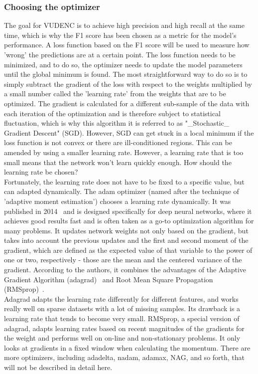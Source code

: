 \documentclass[
a4paper,
pagesize,
pdftex,
12pt,
ngerman,
fleqn,
final,
]{scrartcl}
\begin{document}
	\subsubsection{Choosing the optimizer}\label{optimizer}
	The goal for VUDENC is to achieve high precision and high recall at the same time, which is why the F1 score has been chosen as a metric for the model's performance. A loss function based on the F1 score will be used to measure how 'wrong' the predictions are at a certain point. The loss function needs to be minimized, and to do so, the optimizer needs to update the model parameters until the global minimum is found. 	The most straightforward way to do so is to simply subtract the gradient of the loss with respect to the weights multiplied by a small number called the 'learning rate' from the weights that are to be optimized. The gradient is calculated for a different sub-sample of the data with each iteration of the optimization and is therefore subject to statistical fluctuation, which is why this algorithm it is referred to as "\_Stochastic\_ Gradient Descent" (SGD). However, SGD can get stuck in a local minimum if the loss function is not convex or there are ill-conditioned regions. This can be amended by using a smaller learning rate. However, a learning rate that is too small means that the network won't learn quickly enough. How should the learning rate be chosen?\\
	Fortunately, the learning rate does not have to be fixed to a specific value, but can adapted dynamically. The adam optimizer (named after the technique of 'adaptive moment estimation') chooses a learning rate dynamically. It was published in 2014~\cite{Kingma.2014} and is designed specifically for deep neural networks, where it achieves good results fast and is often taken as a go-to optimization algorithm for many problems. It updates network weights not only based on the gradient, but takes into account the previous updates and the first and second moment of the gradient, which are defined as the expected value of that variable to the power of one or two, respectively - those are the mean and the centered variance of the gradient. According to the authors, it combines the advantages of the Adaptive Gradient Algorithm (adagrad)~\cite{Duchi.2011} and Root Mean Square Propagation (RMSprop)~\cite{Tieleman.2012}.\\
	Adagrad adapts the learning rate differently for different features, and works really well on sparse datasets with a lot of missing samples. Its drawback is a learning rate that tends to become very small. RMSprop, a special version of adagrad, adapts learning rates based on recent magnitudes of the gradients for the weight and performs well on on-line and non-stationary problems. It only looks at gradients in a fixed window when calculating the momentum. There are more optimizers, including adadelta, nadam, adamax, NAG, and so forth, that will not be described in detail here.\\
\end{document}

